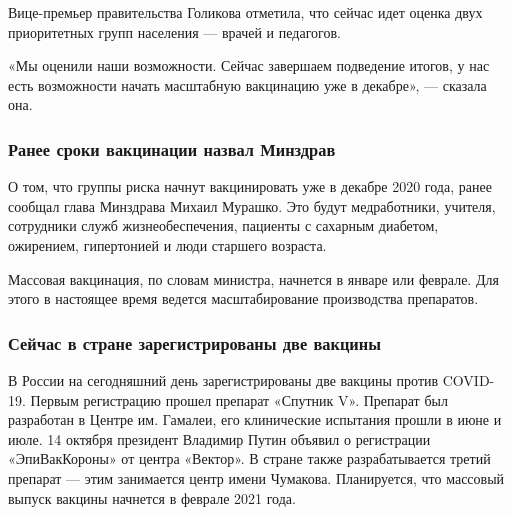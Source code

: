 Вице-премьер правительства Голикова отметила, что сейчас идет оценка двух
приоритетных групп населения — врачей и педагогов.

«Мы оценили наши возможности. Сейчас завершаем подведение итогов, у нас есть
возможности начать масштабную вакцинацию уже в декабре», — сказала она.

\subsubsection{Ранее сроки вакцинации назвал Минздрав}

О том, что группы риска начнут вакцинировать уже в декабре 2020 года, ранее сообщал глава Минздрава Михаил Мурашко. Это будут медработники, учителя, сотрудники служб жизнеобеспечения, пациенты с сахарным диабетом, ожирением, гипертонией и люди старшего возраста.

Массовая вакцинация, по словам министра, начнется в январе или феврале. Для
этого в настоящее время ведется масштабирование производства препаратов.

\subsubsection{Сейчас в стране зарегистрированы две вакцины}

В России на сегодняшний день зарегистрированы две вакцины против COVID-19.
Первым регистрацию прошел препарат «Спутник V». Препарат был разработан в
Центре им. Гамалеи, его клинические испытания прошли в июне и июле. 14 октября
президент Владимир Путин объявил о регистрации «ЭпиВакКороны» от центра
«Вектор». В стране также разрабатывается третий препарат — этим занимается
центр имени Чумакова. Планируется, что массовый выпуск вакцины начнется в
феврале 2021 года.
